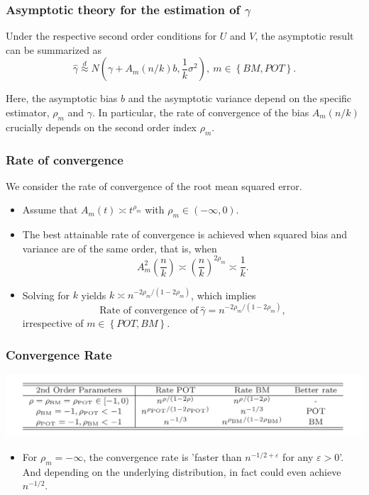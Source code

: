 \documentclass{beamer}
\newcommand{\suit}[1]{\left(#1\right)}
\newcommand{\set}[1]{\left\{#1\right\}}
\begin{document}
\begin{frame}
    \frametitle{Asymptotic theory for the estimation of $\gamma$}
    Under the respective second order conditions for $U$ and $V$, the asymptotic result can be summarized as 
    $$
\hat{\gamma}\stackrel{d}{\approx} N\suit{\gamma+A_m(n/k)b,\frac{1}{k}\sigma^2}, \ m \in \set{BM,POT}.
    $$
    
    Here, the asymptotic bias $b$ and the asymptotic variance depend on the specific estimator, $\rho_m$ and $\gamma$. In particular,
    the rate of convergence of the bias $A_m(n/k)$ crucially depends on the second order index $\rho_m$.

\end{frame}

\begin{frame}
    \frametitle{Rate of convergence}
We consider the rate of convergence of the root mean squared error.

\begin{itemize}
    \item Assume that $A_m(t) \asymp t^{\rho_m}$ with $\rho_m\in (-\infty,0)$.
    \item The best attainable
    rate of convergence is achieved when squared bias and variance are of the same order, that is, when 
    $$
        A_m^2\suit{\frac{n}{k}} \asymp \suit{\frac{n}{k}}^{2\rho_m} \asymp \frac{1}{k}.
    $$
    \item Solving for $k$ yields $k \asymp n^{-2\rho_m/(1-2\rho_m)}$, which implies
    $$
\text{Rate of convergence of} \ \hat{\gamma} = n^{-2\rho_m/(1-2\rho_m)},
    $$
    irrespective of $m \in \set{POT,BM}$.
\end{itemize}
    

\end{frame}

\begin{frame}
    \frametitle{Convergence Rate}
\includegraphics[width=1\textwidth]{fig2.png}
    
\begin{itemize}
    \item For $\rho_m=-\infty$, the convergence rate is 'faster than $n^{-1/2+\varepsilon}$ for any $\varepsilon>0$'. And depending on the underlying distribution, in fact could even achieve $n^{-1/2}$.
\end{itemize}
\end{frame}
\end{document}
